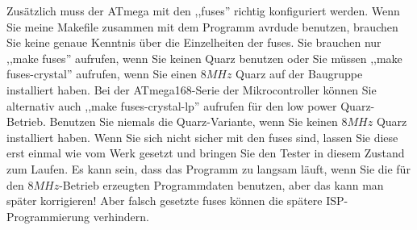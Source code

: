 Zusätzlich muss der ATmega mit den ,,fuses'' richtig konfiguriert werden.
Wenn Sie meine Makefile zusammen mit dem Programm avrdude \cite{avrdude} benutzen, brauchen Sie
keine genaue Kenntnis über die Einzelheiten der fuses.
Sie brauchen nur ,,make fuses'' aufrufen, wenn Sie keinen Quarz benutzen oder Sie
müssen ,,make fuses-crystal'' aufrufen, wenn Sie einen \(8MHz\) Quarz auf der Baugruppe installiert haben.
Bei der ATmega168-Serie der Mikrocontroller können Sie alternativ auch
,,make fuses-crystal-lp'' aufrufen für den low power Quarz-Betrieb.
Benutzen Sie niemals die Quarz-Variante, wenn Sie keinen \(8MHz\) Quarz installiert haben.
Wenn Sie sich nicht sicher mit den fuses sind, lassen Sie diese erst einmal wie
vom Werk gesetzt und bringen Sie den Tester in diesem Zustand zum Laufen.
Es kann sein, dass das Programm zu langsam läuft, wenn Sie die für den \(8MHz\)-Betrieb 
erzeugten Programmdaten benutzen, aber das kann man später korrigieren!
Aber falsch gesetzte fuses können die spätere ISP-Programmierung verhindern.

